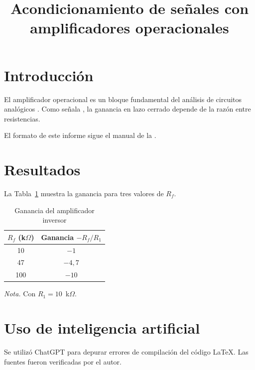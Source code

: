 \documentclass[stu,12pt,a4paper,floatsintext]{apa7}
\title{Acondicionamiento de señales con amplificadores operacionales}
\begin{document}
\maketitle

\section{Introducción}
El amplificador operacional es un bloque fundamental del análisis de circuitos
analógicos \parencite{sedra2020}. Como señala \textcite{boylestad2023}, la ganancia
en lazo cerrado depende de la razón entre resistencias.

El formato de este informe sigue el manual de la \textcite{apa2020}.

\section{Resultados}
La Tabla~\ref{tab:ganancia} muestra la ganancia para tres valores de $R_f$.

\begin{table}[htbp]
  \caption{Ganancia del amplificador inversor}
  \label{tab:ganancia}
  \centering
  \begin{threeparttable}
  \begin{tabular}{cc}
    \toprule
    $R_f$ (k$\Omega$) & Ganancia $-R_f/R_1$ \\
    \midrule
    10 & $-1$ \\
    47 & $-4{,}7$ \\
    100 & $-10$ \\
    \bottomrule
  \end{tabular}
  \begin{tablenotes}[para]
    \item \textit{Nota.} Con $R_1 = 10$~k$\Omega$.
  \end{tablenotes}
  \end{threeparttable}
\end{table}

\section{Uso de inteligencia artificial}
Se utilizó ChatGPT \parencite{openai_chatgpt} para depurar errores de compilación
del código \LaTeX. Las fuentes fueron verificadas por el autor.

\printbibliography[title={Referencias}]
\end{document}
